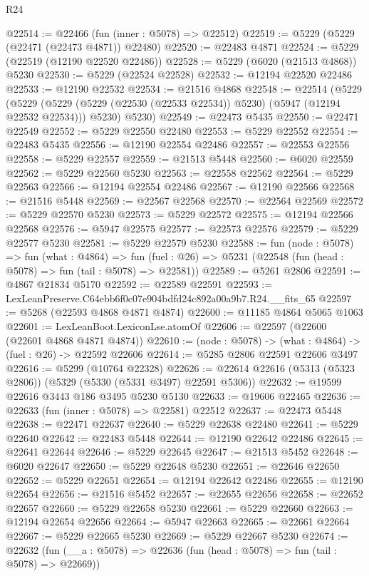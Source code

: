 \begin{lexlean}{R24}
\begin{coremodule}
@22514 := @22466 (fun (inner : @5078) => @22512)
@22519 := @5229 (@5229 (@22471 (@22473 @4871)) @22480)
@22520 := @22483 @4871
@22524 := @5229 (@22519 (@12190 @22520 @22486))
@22528 := @5229 (@6020 (@21513 @4868)) @5230
@22530 := @5229 (@22524 @22528)
@22532 := @12194 @22520 @22486
@22533 := @12190 @22532
@22534 := @21516 @4868
@22548 := @22514
    (@5229
      (@5229 (@5229 (@5229 (@22530 (@22533 @22534)) @5230) (@5947 (@12194 @22532 @22534))) @5230)
      @5230)
@22549 := @22473 @5435
@22550 := @22471 @22549
@22552 := @5229 @22550 @22480
@22553 := @5229 @22552
@22554 := @22483 @5435
@22556 := @12190 @22554 @22486
@22557 := @22553 @22556
@22558 := @5229 @22557
@22559 := @21513 @5448
@22560 := @6020 @22559
@22562 := @5229 @22560 @5230
@22563 := @22558 @22562
@22564 := @5229 @22563
@22566 := @12194 @22554 @22486
@22567 := @12190 @22566
@22568 := @21516 @5448
@22569 := @22567 @22568
@22570 := @22564 @22569
@22572 := @5229 @22570 @5230
@22573 := @5229 @22572
@22575 := @12194 @22566 @22568
@22576 := @5947 @22575
@22577 := @22573 @22576
@22579 := @5229 @22577 @5230
@22581 := @5229 @22579 @5230
@22588 := fun (node : @5078) =>
  fun (what : @4864) =>
  fun (fuel : @26) => @5231 (@22548 (fun (head : @5078) => fun (tail : @5078) => @22581))
@22589 := @5261 @2806
@22591 := @4867 @21834 @5170
@22592 := @22589 @22591
@22593 := LexLeanPreserve.C64ebb6f0c07e904bdfd24c892a00a9b7.R24.__fits_65
@22597 := @5268 (@22593 @4868 @4871 @4874)
@22600 := @11185 @4864 @5065 @1063
@22601 := LexLeanBoot.LexiconLse.atomOf
@22606 := @22597 (@22600 (@22601 @4868 @4871 @4874))
@22610 := (node : @5078) -> (what : @4864) -> (fuel : @26) -> @22592 @22606
@22614 := @5285 @2806 @22591 @22606 @3497
@22616 := @5299 (@10764 @22328)
@22626 := @22614 @22616 (@5313 (@5323 @2806)) (@5329 (@5330 (@5331 @3497) @22591 @5306))
@22632 := @19599 @22616 @3443 @186 @3495 @5230 @5130
@22633 := @19606 @22465
@22636 := @22633 (fun (inner : @5078) => @22581) @22512
@22637 := @22473 @5448
@22638 := @22471 @22637
@22640 := @5229 @22638 @22480
@22641 := @5229 @22640
@22642 := @22483 @5448
@22644 := @12190 @22642 @22486
@22645 := @22641 @22644
@22646 := @5229 @22645
@22647 := @21513 @5452
@22648 := @6020 @22647
@22650 := @5229 @22648 @5230
@22651 := @22646 @22650
@22652 := @5229 @22651
@22654 := @12194 @22642 @22486
@22655 := @12190 @22654
@22656 := @21516 @5452
@22657 := @22655 @22656
@22658 := @22652 @22657
@22660 := @5229 @22658 @5230
@22661 := @5229 @22660
@22663 := @12194 @22654 @22656
@22664 := @5947 @22663
@22665 := @22661 @22664
@22667 := @5229 @22665 @5230
@22669 := @5229 @22667 @5230
@22674 := @22632 (fun (__a : @5078) => @22636 (fun (head : @5078) => fun (tail : @5078) => @22669))

\end{coremodule}
\end{lexlean}

